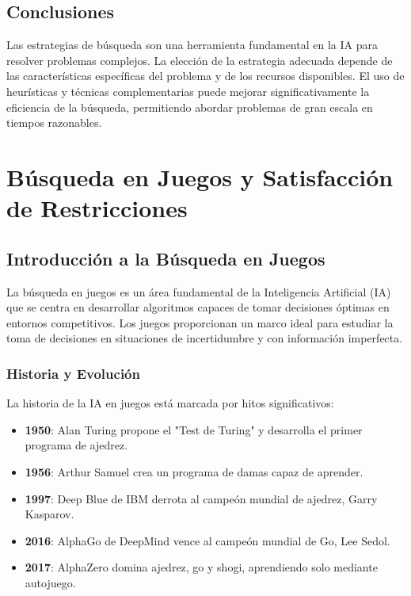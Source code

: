 \documentclass[12pt,a4paper]{report}
\begin{document}
	\section{Conclusiones}
	
	Las estrategias de búsqueda son una herramienta fundamental en la IA para resolver problemas complejos. La elección de la estrategia adecuada depende de las características específicas del problema y de los recursos disponibles. El uso de heurísticas y técnicas complementarias puede mejorar significativamente la eficiencia de la búsqueda, permitiendo abordar problemas de gran escala en tiempos razonables.
	
	\chapter{Búsqueda en Juegos y Satisfacción de Restricciones}
	
	\section{Introducción a la Búsqueda en Juegos}
	
	La búsqueda en juegos es un área fundamental de la Inteligencia Artificial (IA) que se centra en desarrollar algoritmos capaces de tomar decisiones óptimas en entornos competitivos. Los juegos proporcionan un marco ideal para estudiar la toma de decisiones en situaciones de incertidumbre y con información imperfecta.
	
	\subsection{Historia y Evolución}
	
	La historia de la IA en juegos está marcada por hitos significativos:
	
	\begin{itemize}
		\item \textbf{1950}: Alan Turing propone el "Test de Turing" y desarrolla el primer programa de ajedrez.
		\item \textbf{1956}: Arthur Samuel crea un programa de damas capaz de aprender.
		\item \textbf{1997}: Deep Blue de IBM derrota al campeón mundial de ajedrez, Garry Kasparov.
		\item \textbf{2016}: AlphaGo de DeepMind vence al campeón mundial de Go, Lee Sedol.
		\item \textbf{2017}: AlphaZero domina ajedrez, go y shogi, aprendiendo solo mediante autojuego.
	\end{itemize}
	
\end{document}

